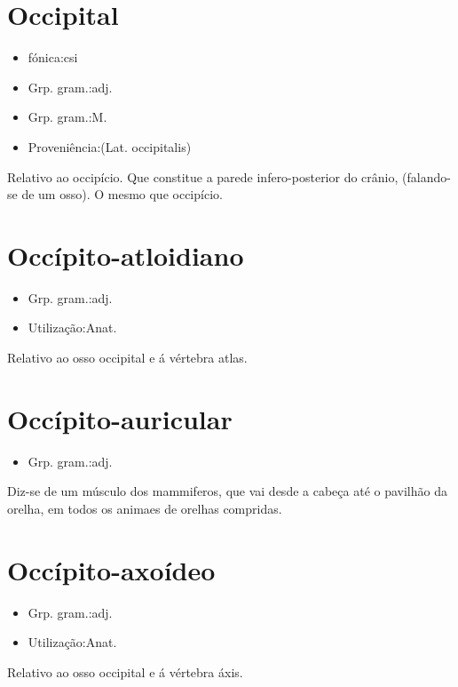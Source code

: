 \section{Occipital}
\begin{itemize}
\item {fónica:csi}
\end{itemize}
\begin{itemize}
\item {Grp. gram.:adj.}
\end{itemize}
\begin{itemize}
\item {Grp. gram.:M.}
\end{itemize}
\begin{itemize}
\item {Proveniência:(Lat. \textunderscore occipitalis\textunderscore )}
\end{itemize}
Relativo ao occipício.
Que constitue a parede infero-posterior do crânio, (falando-se de um osso).
O mesmo que \textunderscore occipício\textunderscore .
\section{Occípito-atloidiano}
\begin{itemize}
\item {Grp. gram.:adj.}
\end{itemize}
\begin{itemize}
\item {Utilização:Anat.}
\end{itemize}
Relativo ao osso occipital e á vértebra atlas.
\section{Occípito-auricular}
\begin{itemize}
\item {Grp. gram.:adj.}
\end{itemize}
Diz-se de um músculo dos mammiferos, que vai desde a cabeça até o pavilhão da orelha, em todos os animaes de orelhas compridas.
\section{Occípito-axoídeo}
\begin{itemize}
\item {Grp. gram.:adj.}
\end{itemize}
\begin{itemize}
\item {Utilização:Anat.}
\end{itemize}
Relativo ao osso occipital e á vértebra áxis.
